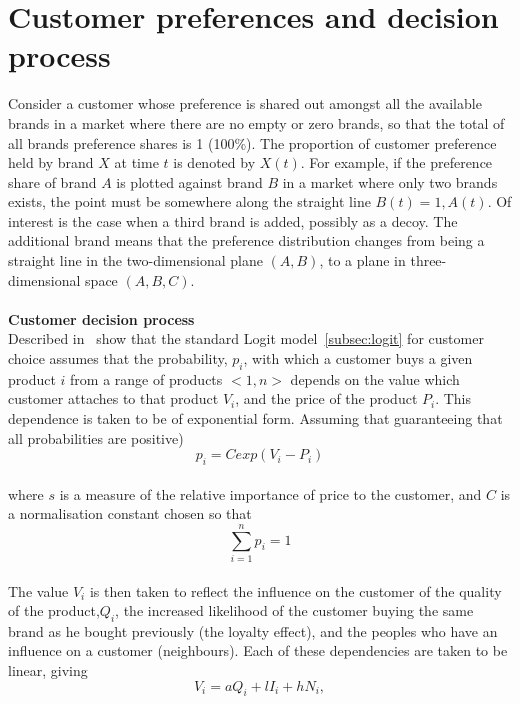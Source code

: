 \section{Customer preferences and decision process} \label{sec:customer_preferences}
Consider a customer whose preference is shared out amongst all the available brands in a market where there are
no empty or zero brands, so that the total of all brands preference shares is 1 (100\%).
The proportion of customer preference held by brand $X$ at time $t$ is denoted by $X(t)$.
For example, if the preference share of brand $A$ is plotted against brand $B$ in a market where only two brands exists,
the point must be somewhere along the straight line $B(t) = 1, A(t)$.
Of interest is the case when a third brand is added, possibly as a decoy.
The additional brand means that the preference distribution changes from being a straight line in the two-dimensional plane $(A, B)$,
to a plane in three-dimensional space $(A,B,C)$.\\
\\
\textbf{Customer decision process} \label{sec:decision}\\
Described in~\cite{patel} show that the standard Logit model~\ref{subsec:logit} for customer choice assumes that
the probability, $p_i$, with which a customer buys a given product $i$ from a range of products $<1, n>$ depends on
the value which customer attaches to that product $V_i$, and the price of the product $P_i$.
This dependence is taken to be of exponential form.
Assuming that guaranteeing that all probabilities are positive)
\\
\begin{equation} \label{eq:7}
p_i = C exp(V_i - P_i)
\end{equation}
\\
where $s$ is a measure of the relative importance of price to the customer, and $C$ is a normalisation constant chosen so that
\\
\begin{equation} \label{eq:8}
\sum_{i=1}^n p_i = 1
\end{equation}
\\
The value $V_i$ is then taken to reflect the influence on the customer of the quality of the product,$Q_i$,
the increased likelihood of the customer buying the same brand as he bought previously (the loyalty effect),
and the peoples who have an influence on a customer (neighbours).
Each of these dependencies are taken to be linear, giving
\\
\begin{equation} \label{eq:9}
V_i = aQ_i + lI_i + hN_i,
\end{equation}
